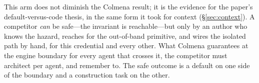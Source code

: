 This arm does not diminish the Colmena result; it is the evidence for the
paper's default-versus-code thesis, in the same form it took for context
(\S\ref{sec:context}). A competitor \emph{can} be safe---the invariant is
reachable---but only by an author who knows the hazard, reaches for the
out-of-band primitive, and wires the isolated path by hand, for this
credential and every other. What Colmena guarantees at the engine boundary
for every agent that crosses it, the competitor must architect per agent,
and remember to. The safe outcome is a default on one side of the boundary
and a construction task on the other.
